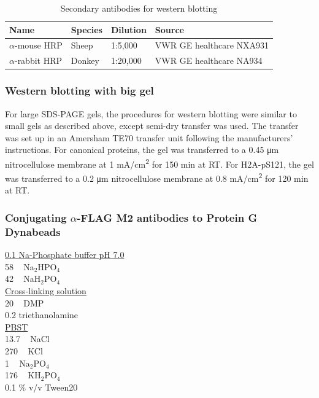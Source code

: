 \begin{table}[htbp]
\centering
\caption{Secondary antibodies for western blotting}
\label{tab:2ndab}
\begin{tabular}{llll}
\hline
\textbf{Name} & \textbf{Species} & \textbf{Dilution} & \textbf{Source} \\ \hline
$\alpha$-mouse HRP & Sheep & 1:5,000 & VWR GE healthcare NXA931 \\   
$\alpha$-rabbit HRP & Donkey & 1:20,000 & VWR GE healthcare NA934 \\   
\end{tabular}
\end{table}


\subsubsection{Western blotting with big gel}

For large SDS-PAGE gels, the procedures for western blotting were similar to small gels as described above, except semi-dry transfer was used. The transfer was set up in an Amersham TE70 transfer unit following the manufacturers' instructions. For canonical proteins, the gel was transferred to a 0.45 \si{\micro\metre} nitrocellulose membrane at 1 \si{\milli\ampere/\centi\metre^2} for 150 \si{\minute} at RT. For H2A-pS121, the gel was transferred to a 0.2 \si{\micro\metre} nitrocellulose membrane at 0.8 \si{\milli\ampere/\centi\metre^2} for 120 \si{\minute} at RT. 

\subsubsection{Conjugating $\alpha$-FLAG M2 antibodies to Protein G Dynabeads}

\underline{0.1 \si{\Molar} Na-Phosphate buffer pH 7.0} \\
58 \si{\milli\Molar} Na$_{2}$HPO$_{4}$ \\ 
42 \si{\milli\Molar} NaH$_{2}$PO$_{4}$ \\ 

\underline{Cross-linking solution}\\
20 \si{\milli\Molar} DMP \\
0.2 \si{\Molar} triethanolamine \\

\underline{PBST}\\
13.7 \si{\milli\Molar} NaCl\\
270 \si{\micro\Molar} KCl\\
1 \si{\milli\Molar} Na$_{2}$PO$_{4}$\\
176 \si{\micro\Molar} KH$_{2}$PO$_{4}$\\
0.1 \% v/v Tween20\\


